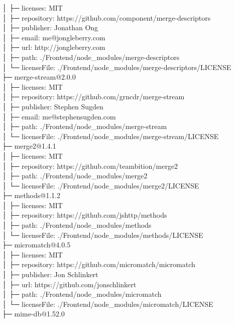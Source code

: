 │  ├─ licenses: MIT\\
│  ├─ repository: https://github.com/component/merge-descriptors\\
│  ├─ publisher: Jonathan Ong\\
│  ├─ email: me@jongleberry.com\\
│  ├─ url: http://jongleberry.com\\
│  ├─ path: ./Frontend/node\_modules/merge-descriptors\\
│  └─ licenseFile: ./Frontend/node\_modules/merge-descriptors/LICENSE\\
├─ merge-stream@2.0.0\\
│  ├─ licenses: MIT\\
│  ├─ repository: https://github.com/grncdr/merge-stream\\
│  ├─ publisher: Stephen Sugden\\
│  ├─ email: me@stephensugden.com\\
│  ├─ path: ./Frontend/node\_modules/merge-stream\\
│  └─ licenseFile: ./Frontend/node\_modules/merge-stream/LICENSE\\
├─ merge2@1.4.1\\
│  ├─ licenses: MIT\\
│  ├─ repository: https://github.com/teambition/merge2\\
│  ├─ path: ./Frontend/node\_modules/merge2\\
│  └─ licenseFile: ./Frontend/node\_modules/merge2/LICENSE\\
├─ methods@1.1.2\\
│  ├─ licenses: MIT\\
│  ├─ repository: https://github.com/jshttp/methods\\
│  ├─ path: ./Frontend/node\_modules/methods\\
│  └─ licenseFile: ./Frontend/node\_modules/methods/LICENSE\\
├─ micromatch@4.0.5\\
│  ├─ licenses: MIT\\
│  ├─ repository: https://github.com/micromatch/micromatch\\
│  ├─ publisher: Jon Schlinkert\\
│  ├─ url: https://github.com/jonschlinkert\\
│  ├─ path: ./Frontend/node\_modules/micromatch\\
│  └─ licenseFile: ./Frontend/node\_modules/micromatch/LICENSE\\
├─ mime-db@1.52.0\\

